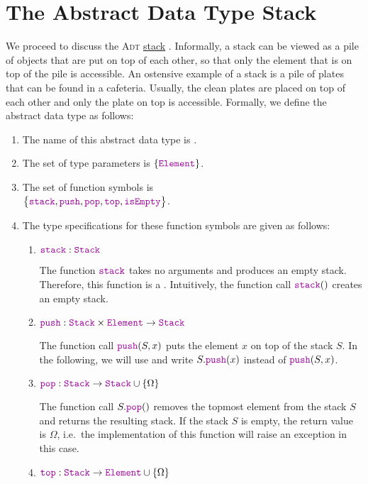 \section{The Abstract Data Type Stack}
We proceed to discuss the \textsc{Adt} \href{https://en.wikipedia.org/wiki/Stack_(abstract_data_type)}{stack} 
. 
Informally, a stack can be viewed as a pile of objects that are put on top of each other, so that
only the element that is on top of the pile is accessible.  An ostensive example of a stack is a pile of
plates that can be found in a cafeteria.  Usually, the clean plates are placed on top of each other
and only the plate on top is accessible.  Formally, we define the abstract data type
 as follows: 
\begin{enumerate}
\item The name of this abstract data type is .
\item The set of type parameters is $\{ \mytt{Element} \}$.
\item The set of function symbols is \\[0.2cm]
      \hspace*{1.3cm} 
      $\bigl\{ \mytt{stack}, \mytt{push}, \mytt{pop}, \mytt{top}, \mytt{isEmpty} \bigr\}$.
\item The type specifications for these function symbols are given as follows:
      \begin{enumerate}
      \item $\mytt{stack}: \mytt{Stack}$

            The function $\mytt{stack}$ takes no arguments and produces an empty stack.
            Therefore, this function is a .  Intuitively, the function call $\mytt{stack}()$ 
            creates an empty stack.
      \item $\mytt{push}: \mytt{Stack} \times \mytt{Element} \rightarrow \mytt{Stack}$

            The function call $\mytt{push}(S,x)$ puts the element $x$ on top of the stack $S$.  In
            the following, we will use 
            and write $S.\mytt{push}(x)$ instead of $\mytt{push}(S,x)$.
      \item $\mytt{pop}: \mytt{Stack}  \rightarrow \mytt{Stack} \cup \{ \Omega \}$

            The function call $S.\mytt{pop}()$ removes the topmost element from the stack $S$ and returns the
            resulting stack.  If the stack $S$ is empty, the return value is $\Omega$, i.e.~the implementation
            of this function will raise an exception in this case.
      \item $\mytt{top}: \mytt{Stack} \rightarrow \mytt{Element} \cup \{ \Omega \}$


\end{enumerate}
\end{enumerate}
